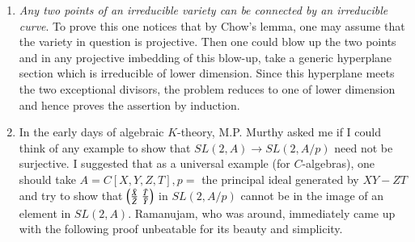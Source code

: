 \begin{enumerate}
\item \emph{Any two points of an irreducible variety can be connected by an 
irreducible curve}. To prove this one notices that by Chow's lemma, 
one may assume that the variety in question is projective. Then one 
could blow up the two points and in any projective imbedding of this 
blow-up, take a generic hyperplane section which is irreducible of 
lower dimension. Since this hyperplane meets the two exceptional 
divisors, the problem reduces to one of lower dimension and hence 
proves the assertion by induction.
\item In the early days of algebraic $K$-theory, M.P. Murthy asked me 
if I could think of any example to show that $SL(2,A)\to SL(2,A/p)$ 
need not be surjective. I suggested that as a universal example (for 
$C$-algebras), one should take $A=C[X,Y,Z,T],p=$ the principal ideal 
generated by $XY-ZT$ and try to show that 
$\left({\frac{\bar{X}}{\bar{Z}}\; \frac{\bar{T}}{\bar{Y}}}\right)$ in 
$SL(2,A/p)$ cannot be in the image of an element in $SL(2,A)$. 
Ramanujam, who was around, immediately came up with the following 
proof unbeatable for its beauty and simplicity.


\end{enumerate}
